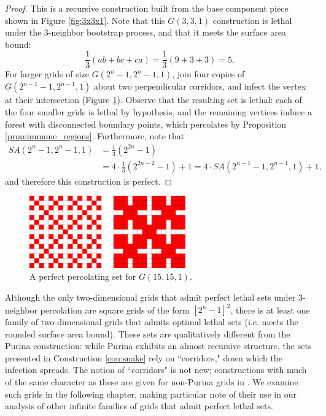 \begin{proof}
This is a recursive construction built from the base component piece shown in Figure \ref{fig:3x3x1}. Note that this $G(3,3,1)$ construction is lethal under the 3-neighbor bootstrap process, and that it meets the surface area bound:
$$\frac{1}{3} (ab+bc+ca) = \frac{1}{3} (9 + 3 + 3) = 5.$$
For larger grids of size $G(2^n-1, 2^n-1, 1)$, join four copies of $G(2^{n-1}-1, 2^{n-1}, 1)$ about two perpendicular corridors, and infect the vertex at their intersection (Figure \ref{fig:15x15x1}). Observe that the resulting set is lethal: each of the four smaller grids is lethal by hypothesis, and the remaining vertices induce a forest with disconnected boundary points, which percolates by Proposition \ref{prop:immune_regions}. Furthermore, note that
\begin{align*}
SA(2^n-1,2^n-1,1) &= \frac{1}{3} (2^{2n}-1) \\
&= 4 \cdot \frac{1}{3} (2^{2n-2} -1) + 1 = 4 \cdot SA(2^{n-1}-1, 2^{n-1}, 1) + 1,
\end{align*}
and therefore this construction is perfect.
\end{proof}

\begin{figure}[]
\centering
\includegraphics[width=0.6\textwidth]{figures/7/15x15x1.pdf}
\caption{A perfect percolating set for $G(15,15,1)$.}
\label{fig:15x15x1}
\end{figure} 

Although the only two-dimensional grids that admit perfect lethal sets under 3-neighbor percolation are square grids of the form $[2^n-1]^2$, there is at least one family of two-dimensional grids that admits optimal lethal sets (i.e. meets the rounded surface area bound). These sets are qualitatively different from the Purina construction: while Purina exhibits an almost recursive structure, the sets presented in Construction \ref{con:snake} rely on ``corridors," down which the infection spreads. The notion of ``corridors" is not new; constructions with much of the same character as these are given for non-Purina grids in \cite{benevides:2021}. We examine such grids in the following chapter, making particular note of their use in our analysis of other infinite families of grids that admit perfect lethal sets. 

